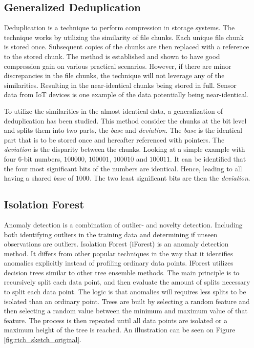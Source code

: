 \subsection{Generalized Deduplication}
Deduplication is a technique to perform compression in storage systems. The technique works by utilizing the similarity of file chunks. Each unique file chunk is stored once. Subsequent copies of the chunks are then replaced with a reference to the stored chunk. The method is established and shown to have good compression gain on various practical scenarios\cite{deduplication}. However, if there are minor discrepancies in the file chunks, the technique will not leverage any of the similarities. Resulting in the near-identical chunks being stored in full. Sensor data from IoT devices is one example of the data potentially being near-identical.

To utilize the similarities in the almost identical data, a generalization of deduplication has been studied.
This method consider the chunks at the bit level and splits them into two parts, the \textit{base} and \textit{deviation}. The \textit{base} is the identical part that is to be stored once and hereafter referenced with pointers. The \textit{deviation} is the disparity between the chunks. Looking at a simple example with four 6-bit numbers, $100000$, $100001$, $100010$ and $100011$. It can be identified that the four most significant bits of the numbers are identical. Hence, leading to all having a shared \textit{base} of $1000$. The two least significant bits are then the \textit{deviation}\cite{gen-deduplication}.

\subsection{Isolation Forest}
Anomaly detection is a combination of outlier- and novelty detection. Including both identifying outliers in the training data and determining if unseen observations are outliers. Isolation Forest (iForest) is an anomaly detection method. It differs from other popular techniques in the way that it identifies anomalies explicitly instead of profiling ordinary data points\cite{iforest}. IForest utilizes decision trees similar to other tree ensemble methods.
The main principle is to recursively split each data point, and then evaluate the amount of splits necessary to split each data point. The logic is that anomalies will requires less splits to be isolated than an ordinary point.
Trees are built by selecting a random feature and then selecting a random value between the minimum and maximum value of that feature. The process is then repeated until all data points are isolated or a maximum height of the tree is reached. An illustration can be seen on Figure \ref{fig:rich_sketch_original}.

